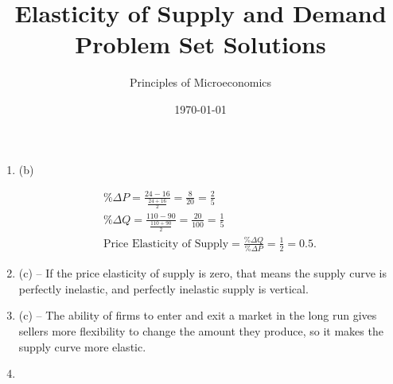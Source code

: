 \documentclass{article}
\title{Elasticity of Supply and Demand Problem Set Solutions}
\author{Principles of Microeconomics}
\date{\today}
\begin{document}
\maketitle

\begin{enumerate}

\item (b)

	\begin{gather*}
	\% \Delta P = \frac{24 - 16}{\frac{24 + 16}{2}} = \frac{8}{20} = \frac{2}{5} \\
	\% \Delta Q = \frac{110 - 90}{\frac{110 + 90}{2}} =  \frac{20}{100} = \frac{1}{5} \\
	\text{Price Elasticity of Supply} = \frac{\% \Delta Q}{\% \Delta P} = \frac{1}{2} = 0.5.
	\end{gather*}
	
\item (c) -- If the price elasticity of supply is zero, that means the supply curve is perfectly inelastic, and perfectly inelastic supply is vertical.

\item (c) -- The ability of firms to enter and exit a market in the long run gives sellers more flexibility to change the amount they produce, so it makes the supply curve more elastic.

\newpage

%
%
%
%
%

\item \phantom{x} \\


\end{enumerate}
\end{document}

